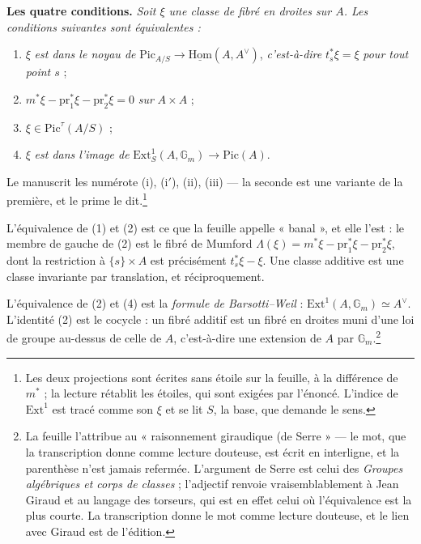 \documentclass[11pt,a4paper]{article}
\begin{document}
\textbf{Les quatre conditions.} \emph{Soit $\xi$ une classe de fibré en
droites sur $A$. Les conditions suivantes sont équivalentes :}

\begin{enumerate}
\item $\xi$ \emph{est dans le noyau de} $\mathrm{Pic}_{A/S} \to
  \underline{\mathrm{Hom}}(A, A^{\vee})$, \emph{c'est-à-dire}
  $t_{s}^{*}\xi = \xi$ \emph{pour tout point $s$} ;
\item $m^{*}\xi - \mathrm{pr}_{1}^{*}\xi - \mathrm{pr}_{2}^{*}\xi = 0$
  \emph{sur} $A \times A$ ;
\item $\xi \in \mathrm{Pic}^{\tau}(A/S)$ ;
\item $\xi$ \emph{est dans l'image de} $\mathrm{Ext}^{1}_{S}(A,
  \mathbb{G}_{m}) \to \mathrm{Pic}(A)$.
\end{enumerate}

Le manuscrit les numérote (i), (i$'$), (ii), (iii) — la seconde est une
variante de la première, et le prime le dit.\footnote{Les deux projections sont
écrites sans étoile sur la feuille, à la différence de $m^{*}$ ; la lecture
rétablit les étoiles, qui sont exigées par l'énoncé. L'indice de
$\mathrm{Ext}^{1}$ est tracé comme son $\xi$ et se lit $S$, la base, que
demande le sens.}

L'équivalence de (1) et (2) est ce que la feuille appelle « banal », et elle
l'est : le membre de gauche de (2) est le fibré de Mumford
$\Lambda(\xi) = m^{*}\xi - \mathrm{pr}_{1}^{*}\xi - \mathrm{pr}_{2}^{*}\xi$,
dont la restriction à $\{s\} \times A$ est précisément $t_{s}^{*}\xi - \xi$.
Une classe additive est une classe invariante par translation, et
réciproquement.

L'équivalence de (2) et (4) est la \emph{formule de Barsotti--Weil} :
$\mathrm{Ext}^{1}(A, \mathbb{G}_{m}) \simeq A^{\vee}$. L'identité (2) est le
cocycle : un fibré additif est un fibré en droites muni d'une loi de groupe
au-dessus de celle de $A$, c'est-à-dire une extension de $A$ par
$\mathbb{G}_{m}$.\footnote{La feuille l'attribue au « raisonnement
giraudique (de Serre » — le mot, que la transcription donne comme lecture
douteuse, est écrit en interligne, et la parenthèse n'est jamais refermée. L'argument de Serre est celui des
\emph{Groupes algébriques et corps de classes} ; l'adjectif renvoie
vraisemblablement à Jean Giraud et au langage des torseurs, qui est en effet
celui où l'équivalence est la plus courte. La transcription donne le mot comme
lecture douteuse, et le lien avec Giraud est de l'édition.}
\end{document}
